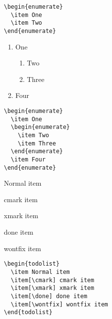 \documentclass[a4paper,11pt,fleqn]{book}
\begin{document}
\begin{enumerate}
\begin{multicols}{2}
  \vfill\null\columnbreak

  \begin{verbatim}
\begin{enumerate}
  \item One
  \item Two
\end{enumerate}
  \end{verbatim}
\end{multicols}

\begin{multicols}{2}
  \begin{enumerate}
    \item One
    \begin{enumerate}
      \item Two
      \item Three
    \end{enumerate}
    \item Four
  \end{enumerate}

  \vfill\null\columnbreak

  \begin{verbatim}
\begin{enumerate}
  \item One
  \begin{enumerate}
    \item Two
    \item Three
  \end{enumerate}
  \item Four
\end{enumerate}
  \end{verbatim}
\end{multicols}

\begin{multicols}{2}
  \begin{todolist}[noitemsep]
    \item Normal item
    \item[\cmark] cmark item
    \item[\xmark] xmark item
    \item[\done] done item
    \item[\wontfix] wontfix item
  \end{todolist}

  \vfill\null\columnbreak

  \begin{verbatim}
\begin{todolist}
  \item Normal item
  \item[\cmark] cmark item
  \item[\xmark] xmark item
  \item[\done] done item
  \item[\wontfix] wontfix item
\end{todolist}
  \end{verbatim}
\end{multicols}


\end{enumerate}
\end{document}
